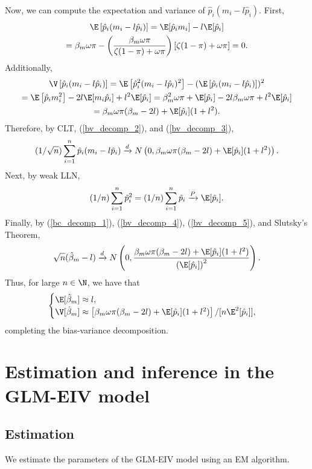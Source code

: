 \documentclass[12pt]{article}
\begin{document}
\begin{appendices}
Now, we can compute the expectation and variance of $\hat{p}_i(m_i - l\hat{p}_i)$. First,
\begin{multline}\label{bv_decomp_2}
\E\left[\hat{p}_i(m_i - l\hat{p}_i) \right] = \E[\hat{p}_i m_i] - l \E[\hat{p}_i] \\ = \beta_m \omega \pi - \left(\frac{\beta_m \omega \pi}{\zeta (1-\pi) + \omega \pi}\right)[\zeta (1-\pi) + \omega \pi] = 0.
\end{multline}
Additionally,
\begin{multline}\label{bv_decomp_3}
\V\left[\hat{p}_i(m_i - l\hat{p}_i)\right] = \E\left[\hat{p}_i^2(m_i - l\hat{p}_i)^2\right] - (\E\left[ \hat{p}_i(m_i - l\hat{p}_i)\right])^2 \\ = \E\left[ \hat{p}_i m_i^2\right] - 2l \E[m_i\hat{p}_i] +l^2 \E[\hat{p}_i]= \beta^2_m \omega \pi + \E[ \hat{p}_i] -2l \beta_m \omega \pi + l^2 \E[\hat{p}_i] \\ = \beta_m\omega\pi(\beta_m - 2l) + \E[\hat{p}_i](1 + l^2).
\end{multline}
Therefore, by CLT, (\ref{bv_decomp_2}), and (\ref{bv_decomp_3}),
\begin{equation}\label{bv_decomp_4}
(1/\sqrt{n})\sum_{i=1}^n \hat{p}_i(m_i - l \hat{p}_i) \xrightarrow{d} N\left(0, \beta_m\omega\pi(\beta_m - 2l) + \E[\hat{p}_i](1 + l^2) \right).
\end{equation}
Next, by weak LLN,
\begin{equation}\label{bv_decomp_5}
(1/n) \sum_{i=1}^n \hat{p}_i^2 = (1/n) \sum_{i=1}^n \hat{p}_i \xrightarrow{P} \E[\hat{p}_i].
\end{equation}
Finally, by (\ref{bc_decomp_1}), (\ref{bv_decomp_4}), (\ref{bv_decomp_5}), and Slutsky's Theorem,
$$ \sqrt{n}(\hat{\beta}_m - l) \xrightarrow{d} N\left(0, \frac{ \beta_m\omega\pi(\beta_m - 2l) + \E[\hat{p}_i](1 + l^2) }{\left(\E[\hat{p}_i]\right)^2} \right).$$ Thus, for large $n \in \N$, we have that 
$$ \begin{cases}
\E [\hat{\beta}_m] \approx l, \\
\V[\hat{\beta}_m] \approx \left[\beta_m\omega\pi(\beta_m - 2l) + \E[\hat{p}_i](1 + l^2)\right]/[n\E^2[\hat{p}_i]],
\end{cases}$$
completing the bias-variance decomposition.

\section{Estimation and inference in the GLM-EIV model}
\subsection{Estimation}
We estimate the parameters of the GLM-EIV model using an EM algorithm.


\end{appendices}
\end{document}
